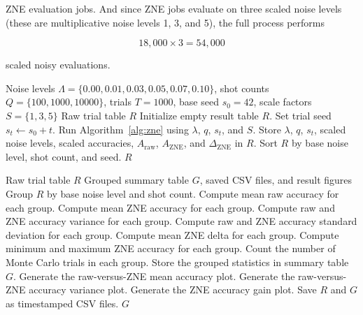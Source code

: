 \documentclass[conference]{IEEEtran}
\begin{document}
ZNE evaluation jobs. And since ZNE jobs evaluate on three scaled noise levels (these are 
multiplicative noise levels 1, 3, and 5), the full process performs

\[
18{,}000 \times 3 = 54{,}000
\]

scaled noisy evaluations.

\begin{algorithm}[H]
\caption{Monte Carlo ZNE Sweep}
\label{alg:mc_sweep}
\begin{algorithmic}[1]
\Require Noise levels $\Lambda=\{0.00,0.01,0.03,0.05,0.07,0.10\}$, shot counts $Q=\{100,1000,10000\}$, trials $T=1000$, base seed $s_0=42$, scale factors $S=\{1,3,5\}$
\Ensure Raw trial table $R$
\State Initialize empty result table $R$.
            \State Set trial seed $s_t \gets s_0 + t$.
            \State Run Algorithm~\ref{alg:zne} using $\lambda$, $q$, $s_t$, and $S$.
            \State Store $\lambda$, $q$, $s_t$, scaled noise levels, scaled accuracies, $A_{\mathrm{raw}}$, $A_{\mathrm{ZNE}}$, and $\Delta_{\mathrm{ZNE}}$ in $R$.
        \EndFor
    \EndFor
\EndFor
\State Sort $R$ by base noise level, shot count, and seed.
\State \Return $R$
\end{algorithmic}
\end{algorithm}

\begin{algorithm}[H]
\caption{Monte Carlo Result Summarization and Output Generation}
\label{alg:mc_postprocessing}
\begin{algorithmic}[1]
\Require Raw trial table $R$
\Ensure Grouped summary table $G$, saved CSV files, and result figures
\State Group $R$ by base noise level and shot count.
\State Compute mean raw accuracy for each group.
\State Compute mean ZNE accuracy for each group.
\State Compute raw and ZNE accuracy variance for each group.
\State Compute raw and ZNE accuracy standard deviation for each group.
\State Compute mean ZNE delta for each group.
\State Compute minimum and maximum ZNE accuracy for each group.
\State Count the number of Monte Carlo trials in each group.
\State Store the grouped statistics in summary table $G$.
\State Generate the raw-versus-ZNE mean accuracy plot.
\State Generate the raw-versus-ZNE accuracy variance plot.
\State Generate the ZNE accuracy gain plot.
\State Save $R$ and $G$ as timestamped CSV files.
\State \Return $G$
\end{algorithmic}
\end{algorithm}
\end{document}
